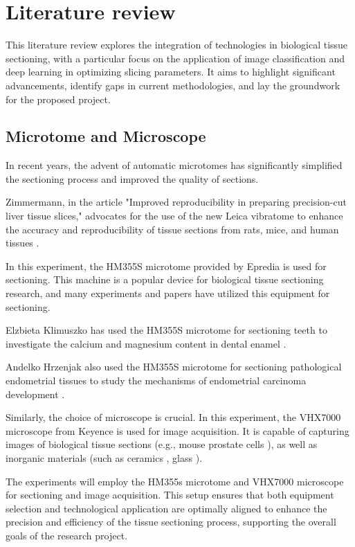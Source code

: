 \section{Literature review}

This literature review explores the integration of technologies in biological tissue sectioning, with a particular focus on the application of image classification and deep learning in optimizing slicing parameters. It aims to highlight significant advancements, identify gaps in current methodologies, and lay the groundwork for the proposed project.

\subsection{Microtome and Microscope}

In recent years, the advent of automatic microtomes has significantly simplified the sectioning process and improved the quality of sections.

Zimmermann, in the article "Improved reproducibility in preparing precision-cut liver tissue slices," advocates for the use of the new Leica vibratome to enhance the accuracy and reproducibility of tissue sections from rats, mice, and human tissues \cite{LR.1}.

In this experiment, the HM355S microtome provided by Epredia is used for sectioning. This machine is a popular device for biological tissue sectioning research, and many experiments and papers have utilized this equipment for sectioning.

Elzbieta Klimuszko has used the HM355S microtome for sectioning teeth to investigate the calcium and magnesium content in dental enamel \cite{LR.2}.

Andelko Hrzenjak also used the HM355S microtome for sectioning pathological endometrial tissues to study the mechanisms of endometrial carcinoma development \cite{LR.3}.

Similarly, the choice of microscope is crucial. In this experiment, the VHX7000 microscope from Keyence is used for image acquisition. It is capable of capturing images of biological tissue sections (e.g., mouse prostate cells \cite{LR.4}),
as well as inorganic materials (such as ceramics \cite{LR.5}, glass \cite{LR.6}).

The experiments will employ the HM355s microtome and VHX7000 microscope for sectioning and image acquisition. This setup ensures that both equipment selection and technological application are optimally aligned to enhance the precision and efficiency of the tissue sectioning process, supporting the overall goals of the research project.

